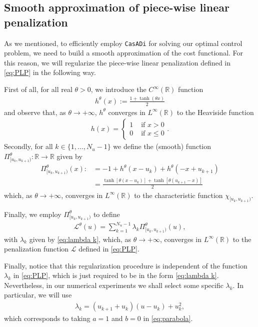 \documentclass[twocolumn]{autart}    %
\begin{document}
\subsection{Smooth approximation of piece-wise linear penalization}

As we mentioned, to efficiently employ \texttt{CasADi} for solving our optimal control problem, we need to build a smooth approximation of the cost functional. For this reason, we will regularize the piece-wise linear penalization defined in \eqref{eq:PLP} in the following way.

First of all, for all real $\theta>0$, we introduce the $C^\infty(\mathbb{R})$ function
\begin{align*}
	\displaystyle h^\theta(x) := \frac{1 + \tanh(\theta x)}{2}
\end{align*}
and observe that, as $\theta\to +\infty$, $h^\theta$ converges in $L^\infty(\mathbb{R})$ to the Heaviside function 
\begin{align*}
    h(x) = \begin{cases}
        1 & \text{ if } x > 0 
        \\
		0 & \text{ if } x \leq 0
    \end{cases}.
\end{align*}
Secondly, for all $k \in \{1,\dots,N_u-1\}$ we define the (smooth) function $\Pi_{[u_k,u_{k+1})}^\theta:\mathbb{R} \rightarrow \mathbb{R}$ given by
\begin{align*}
	\Pi_{[u_k,u_{k+1})}^\theta(x) :&= - 1 + h^\theta(x-u_k) + h^\theta(-x+u_{k+1}) 
	\\[5pt]
	&= \frac{\tanh[\theta(x-u_k)] + \tanh[\theta (u_{k+1}-x)]}{2}
\end{align*}
which, as $\theta\to +\infty$, converges in $L^\infty(\mathbb{R})$ to the characteristic function $\chi_{[u_k,u_{k+1})}$.

Finally, we employ $\Pi_{[u_k,u_{k+1})}^\theta$ to define
\begin{align}\label{eq:Lsmooth}
	\mathcal{L}^\theta(u) = \sum_{k = 1}^{N_u-1} \lambda_k \Pi^\theta_{[u_k,u_{k+1})}(u),
\end{align}
with $\lambda_k$ given by \eqref{eq:lambda k}, which, as $\theta\to +\infty$, converges in $L^\infty(\mathbb{R})$ to the penalization function $\mathcal L$ defined in \eqref{eq:PLP}.

Finally, notice that this regularization procedure is independent of the function $\lambda_k$ in \eqref{eq:PLP}, which is just required to be in the form \eqref{eq:lambda k}. Nevertheless, in our numerical experiments we shall select some specific $\lambda_k$. In particular, we will use 
\begin{gather}
	\lambda_k = (u_{k+1}+u_{k}) (u-u_k) + u_k^2, 
\end{gather}
which corresponds to taking $a=1$ and $b=0$ in \eqref{eq:parabola}.
\end{document}
